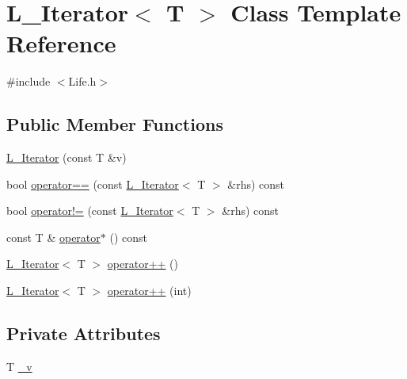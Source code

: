 \hypertarget{classL__Iterator}{\section{L\-\_\-\-Iterator$<$ T $>$ Class Template Reference}
\label{classL__Iterator}
}


{\ttfamily \#include $<$Life.\-h$>$}

\subsection*{Public Member Functions}
\begin{DoxyCompactItemize}
\item 
\hyperlink{classL__Iterator_a8e3c67c47cff51cbb1f452768395d0d0}{L\-\_\-\-Iterator} (const T \&v)
\item 
bool \hyperlink{classL__Iterator_a5717579a4a7fc28ca13171f30ca21b2c}{operator==} (const \hyperlink{classL__Iterator}{L\-\_\-\-Iterator}$<$ T $>$ \&rhs) const 
\item 
bool \hyperlink{classL__Iterator_aa7882f06e6e5e446cf9c58e09a8c3384}{operator!=} (const \hyperlink{classL__Iterator}{L\-\_\-\-Iterator}$<$ T $>$ \&rhs) const 
\item 
const T \& \hyperlink{classL__Iterator_a14f900a1b0cfdd3e80d56b7162e9ff08}{operator$\ast$} () const 
\item 
\hyperlink{classL__Iterator}{L\-\_\-\-Iterator}$<$ T $>$ \hyperlink{classL__Iterator_a4eda0697dd0a55dd33ec57b162e9fc95}{operator++} ()
\item 
\hyperlink{classL__Iterator}{L\-\_\-\-Iterator}$<$ T $>$ \hyperlink{classL__Iterator_af5edd5d0fbbb4f096529c21458255e6b}{operator++} (int)
\end{DoxyCompactItemize}
\subsection*{Private Attributes}
\begin{DoxyCompactItemize}
\item 
T \hyperlink{classL__Iterator_a89ecaa2678876d21a2d7be363728340d}{\-\_\-v}
\end{DoxyCompactItemize}



